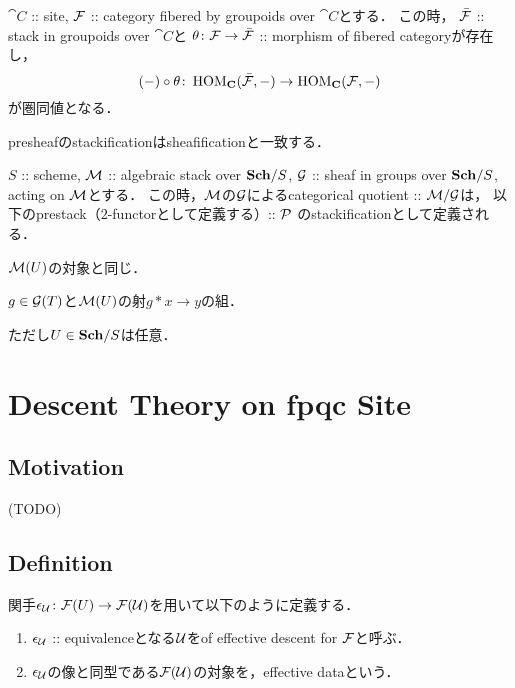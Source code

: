 \documentclass[a4paper]{jsarticle}
\newcommand{\HOM}{\operatorname{HOM}}
\begin{document}
\begin{Thm}
    $\cat{C}$ :: site,
    $\mathcal{F}$ :: category fibered by groupoids over $\cat{C}$とする．
    この時，
    $\bar{\mathcal{F}}$ :: stack in groupoids over $\cat{C}$と
    $\theta \colon \mathcal{F} \to \bar{\mathcal{F}}$ :: morphism of fibered categoryが存在し，
    \[ (-) \circ \theta \colon \HOM_{\cat{C}}(\bar{\shF}, -) \to \HOM_{\cat{C}}(\shF, -) \]
    が圏同値となる．
\end{Thm}

\begin{Example}
    presheafのstackificationはsheafificationと一致する．
\end{Example}

\begin{Example}
    $S$ :: scheme,
    $\mathcal{M}$ :: algebraic stack over $\mathbf{Sch}/S$,
    $\mathcal{G}$ :: sheaf in groups over $\mathbf{Sch}/S$, acting on $\mathcal{M}$とする．
    この時，$\mathcal{M}$の$\mathcal{G}$によるcategorical quotient :: $\mathcal{M}/\mathcal{G}$は，
    以下のprestack（$2$-functorとして定義する）:: $\mathcal{P}$ のstackificationとして定義される．
    \begin{description}[labelindent=1cm]
        \item[Objects of $\shP(U)$.] $\mathcal{M}(U)$の対象と同じ．
        \item[Arrows of $\shP(U)$.]  $g \in \mathcal{G}(T)$と$\mathcal{M}(U)$の射$g \ast x \to y$の組．
    \end{description}
    ただし$U \in \mathbf{Sch}/S$は任意．
\end{Example}

\section{Descent Theory on fpqc Site}
\subsection{Motivation}
    (TODO)

\subsection{Definition}
\begin{Def}
    関手$\epsilon_{\mathcal{U}} \colon \mathcal{F}(U) \to \mathcal{F}(\mathcal{U})$を用いて以下のように定義する．
    \begin{enumerate}[label=(\roman*)]
        \item
            $\epsilon_{\mathcal{U}}$ :: equivalenceとなる$\mathcal{U}$をof effective descent for $\mathcal{F}$と呼ぶ．
        \item
            $\epsilon_{\mathcal{U}}$の像と同型である$\mathcal{F}(\mathcal{U})$の対象を，effective dataという．
    \end{enumerate}
\end{Def}
\end{document}
